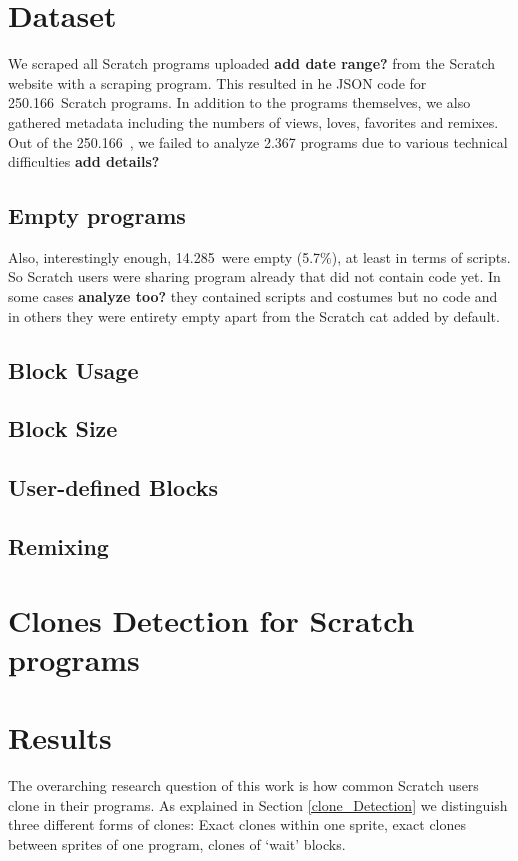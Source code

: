 \documentclass[times,10pt,twocolumn]{article}
\newcommand{\nPrograms}{250.166}
\newcommand{\nemptyPrograms}{14.285}
\newcommand{\todo}[1]{\textbf{#1}}
\begin{document}
\section{Dataset}
\label{dataset}
We scraped all Scratch programs uploaded \todo{add date range?} from the Scratch website with a scraping program. This resulted in he JSON code for \nPrograms~Scratch programs. In addition to the programs themselves, we also gathered metadata including the numbers of views, loves, favorites and remixes. Out of the \nPrograms~, we failed to analyze 2.367 programs due to various technical difficulties \todo{add details?} 

\subsection{Empty programs}

Also, interestingly enough, \nemptyPrograms~were empty (5.7\%), at least in terms of scripts. So Scratch users were sharing program already that did not contain code yet. In some cases \todo{analyze too?} they contained scripts and costumes but no code and in others they were entirety empty apart from the Scratch cat added by default.

\subsection{Block Usage}

\subsection{Block Size}

\subsection{User-defined Blocks}

\subsection{Remixing}

\section{Clones Detection for Scratch programs}
\label{algo}
\label{clone_Detection}



\section{Results}
\label{results}
The overarching research question of this work is how common Scratch users clone in their programs. As explained in Section \ref{clone_Detection} we distinguish three different forms of clones: Exact clones within one sprite, exact clones between sprites of one program, clones of `wait' blocks.
\end{document}
